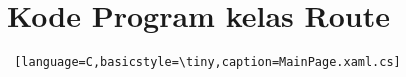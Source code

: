 \chapter{Kode Program kelas Route}
\label{app:H}

\singlespacing 
%
%

\begin{lstlisting} [language=C,basicstyle=\tiny,caption=MainPage.xaml.cs]
\end{lstlisting}